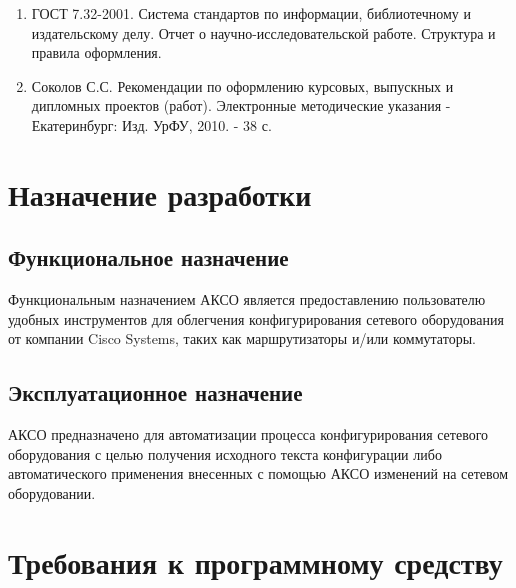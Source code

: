 	\begin{enumerate}
		\item ГОСТ 7.32-2001. Система стандартов по информации, библиотечному и издательскому делу. Отчет о научно-исследовательской работе. Структура и правила оформления\cite{gost-732}.
		\item Соколов С.С. Рекомендации по оформлению курсовых, выпускных и дипломных проектов (работ). Электронные методические указания - Екатеринбург: Изд. УрФУ, 2010. - 38 с.
	\end{enumerate}
	
	
	\section{Назначение разработки}
	
	\subsection{Функциональное назначение}
	
	Функциональным назначением АКСО является предоставлению пользователю удобных инструментов для облегчения конфигурирования сетевого оборудования от компании Cisco Systems, таких как маршрутизаторы и/или коммутаторы.
	
	\subsection{Эксплуатационное назначение}
	
	АКСО предназначено для автоматизации процесса конфигурирования сетевого оборудования с целью получения исходного текста конфигурации либо автоматического применения внесенных с помощью АКСО изменений на сетевом оборудовании.
	
	\section{Требования к программному средству}
	
